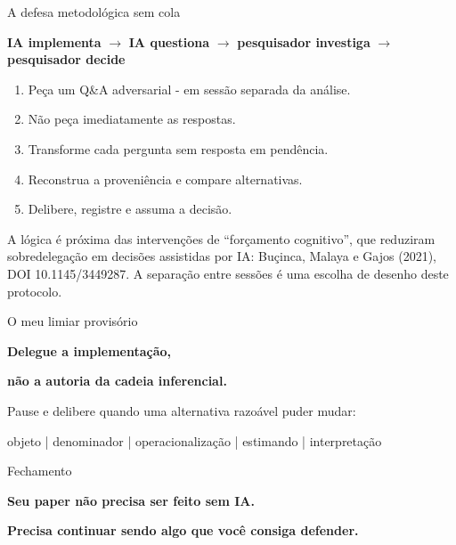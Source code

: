 \documentclass[
  12pt,
  ignorenonframetext,
  aspectratio=169]{beamer}
\begin{document}
\begin{frame}{A defesa metodológica sem cola}
\protect{}\label{a-defesa-metodoluxf3gica-sem-cola}
\begin{center}
\vspace{0.2cm}
\large
\textbf{IA implementa} $\rightarrow$ \textbf{IA questiona} $\rightarrow$ \textbf{pesquisador investiga} $\rightarrow$ \textbf{pesquisador decide}

\vspace{0.35cm}
\small
\begin{enumerate}
\setlength{\itemsep}{2pt}
\item Peça um Q\&A adversarial - em sessão separada da análise.
\item Não peça imediatamente as respostas.
\item Transforme cada pergunta sem resposta em pendência.
\item Reconstrua a proveniência e compare alternativas.
\item Delibere, registre e assuma a decisão.
\end{enumerate}
\end{center}

\vfill{\tiny\color{muted}A lógica é próxima das intervenções de “forçamento cognitivo”, que reduziram sobredelegação em decisões assistidas por IA: Buçinca, Malaya e Gajos (2021), DOI 10.1145/3449287. A separação entre sessões é uma escolha de desenho deste protocolo.}
\end{frame}

\begin{frame}{O meu limiar provisório}
\protect{}\label{o-meu-limiar-provisuxf3rio}
\begin{center}
\vspace{0.5cm}
{\color{teal}\Huge\textbf{Delegue a implementação,}}

\vspace{0.2cm}
{\color{orange}\Huge\textbf{não a autoria da cadeia inferencial.}}

\vspace{0.75cm}
\large Pause e delibere quando uma alternativa razoável puder mudar:

\vspace{0.2cm}
\normalsize objeto \quad | \quad denominador \quad | \quad operacionalização \quad | \quad estimando \quad | \quad interpretação
\end{center}
\end{frame}

\begin{frame}{Fechamento}
\protect{}\label{fechamento}
\begin{center}
\vspace{0.3cm}
{\color{teal}\Huge\textbf{Seu paper não precisa ser feito sem IA.}}

\vspace{0.3cm}
{\color{orange}\Huge\textbf{Precisa continuar sendo algo que você consiga defender.}}

\end{center}
\end{frame}
\end{document}
